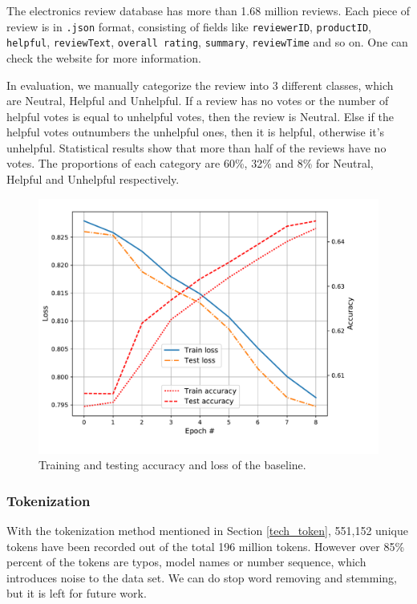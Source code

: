 \documentclass[11pt]{article}
\begin{document}
The electronics review database has more than 1.68 million reviews. Each piece of review is in \texttt{.json} format, consisting of fields like \texttt{reviewerID}, \texttt{productID}, \texttt{helpful}, \texttt{reviewText}, \texttt{overall rating}, \texttt{summary}, \texttt{reviewTime} and so on. One can check the website for more information. 

In evaluation, we manually categorize the review into 3 different classes, which are Neutral, Helpful and Unhelpful. If a review has no votes or the number of helpful votes is equal to unhelpful votes, then the review is Neutral. Else if the helpful votes outnumbers the unhelpful ones, then it is helpful, otherwise it's unhelpful. Statistical results show that more than half of the reviews have no votes. The proportions of each category are 60\%, 32\% and 8\% for Neutral, Helpful and Unhelpful respectively. 

\begin{figure}[tbp]
    \centering
    \includegraphics[width=\linewidth]{./figures/hpcc_train_loss_acc.pdf}
    \caption{Training and testing accuracy and loss of the baseline.}
    \label{result_loss_acc}
\end{figure}

\subsubsection{Tokenization}

With the tokenization method mentioned in Section \ref{tech_token}, 551,152 unique tokens have been recorded out of the total 196 million tokens. However over 85\% percent of the tokens are typos, model names or number sequence, which introduces noise to the data set. We can do stop word removing and stemming, but it is left for future work. 
\end{document}
